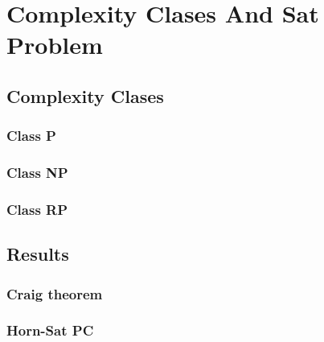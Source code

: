 
\chapter{Complexity Clases And Sat Problem} %



\section{Complexity Clases}



\subsection{Class P}

\subsection{Class NP}


\subsection{Class RP}



\section{Results}

\subsection{Craig theorem}

\subsection{Horn-Sat PC}

